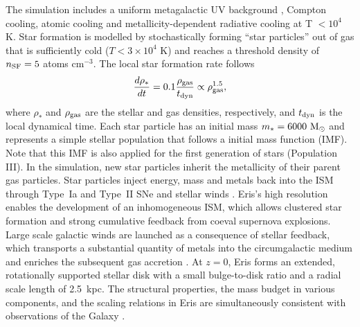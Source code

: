 \documentclass[a4paper,fleqn,usenatbib]{mnras}
\newcommand{\msun}{{\rm M}_{\odot}}
\begin{document}
The simulation includes a uniform metagalactic UV background \citep{HM96},
Compton cooling, atomic cooling and metallicity-dependent radiative
cooling at T $<10^{4}$ K. Star formation is modelled by stochastically
forming ``star particles'' out of gas that is sufficiently cold ($T <
3 \times 10^{4}$ K) and reaches a threshold density of $n_{\rm SF}=5$
atoms cm$^{-3}$. The local star formation rate follows
\begin{equation}
\frac{d\rho_*}{dt}=0.1 \frac{\rho_{\rm gas}}{t_{\rm dyn}} \propto \rho_{\rm
  gas}^{1.5},
\end{equation}
where $\rho_*$ and $\rho_{\rm gas}$ are the stellar and gas densities,
respectively, and $t_{\rm dyn}$ is the local dynamical time. Each star
particle has an initial mass $m_{\ast} = 6000 \ \msun $ and represents
a simple stellar population that follows a \citet{Kroupa93} initial
mass function (IMF). Note that this IMF is also applied for the first
generation of stars (Population III). In the simulation, new star
particles inherit the metallicity of their parent gas particles. Star
particles inject energy, mass and metals back into the ISM through
Type~Ia and Type~II SNe and stellar winds \citep{Stinson06}. Eris's
high resolution enables the development of an inhomogeneous ISM, which
allows clustered star formation and strong cumulative feedback from
coeval supernova explosions. Large scale galactic winds are launched
as a consequence of stellar feedback, which transports a substantial
quantity of metals into the circumgalactic medium and enriches the
subsequent gas accretion \citep{2013ApJ...765...89S}. At $z = 0$, Eris
forms an extended, rotationally supported stellar disk with a small
bulge-to-disk ratio and a radial scale length of 2.5~kpc. The
structural properties, the mass budget in various components, and the
scaling relations in Eris are simultaneously consistent with
observations of the Galaxy \citep{Guedes11}.
\end{document}
